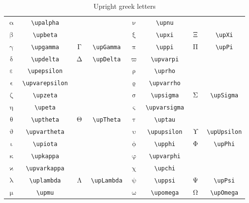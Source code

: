 \documentclass{article}
\begin{document}
\begin{table}
  \caption{Upright greek letters}
  \label{tab:upright-greek-letters}
  \centering
  \begin{tabular}[c]{cccc@{\hskip 3em}cccc}
    \toprule
    $\upalpha$ & \verb|\upalpha| & & &
    $\upnu$ & \verb|\upnu| & & \\
    $\upbeta$ & \verb|\upbeta| & & &
    $\upxi$ & \verb|\upxi| & $\upXi$ & \verb|\upXi| \\
    $\upgamma$ & \verb|\upgamma| & $\upGamma$ & \verb|\upGamma| &
    $\uppi$ & \verb|\uppi| & $\upPi$ & \verb|\upPi| \\
    $\updelta$ & \verb|\updelta| & $\upDelta$ & \verb|\upDelta| &
    $\upvarpi$ & \verb|\upvarpi| & & \\
    $\upepsilon$ & \verb|\upepsilon| & & &
    $\uprho$ & \verb|\uprho| & & \\
    \addlinespace
    $\upvarepsilon$ & \verb|\upvarepsilon| & & &
    $\upvarrho$ & \verb|\upvarrho| & & \\
    $\upzeta$ & \verb|\upzeta| & & &
    $\upsigma$ & \verb|\upsigma| & $\upSigma$ & \verb|\upSigma| \\
    $\upeta$ & \verb|\upeta| & & &
    $\upvarsigma$ & \verb|\upvarsigma| & & \\
    $\uptheta$ & \verb|\uptheta| & $\upTheta$ & \verb|\upTheta| &
    $\uptau$ & \verb|\uptau| & & \\
    $\upvartheta$ & \verb|\upvartheta| & & &
    $\upupsilon$ & \verb|\upupsilon| & $\upUpsilon$ & \verb|\upUpsilon| \\
    \addlinespace
    $\upiota$ & \verb|\upiota| & & &
    $\upphi$ & \verb|\upphi| & $\upPhi$ & \verb|\upPhi| \\
    $\upkappa$ & \verb|\upkappa| & & &
    $\upvarphi$ & \verb|\upvarphi| & & \\
    $\upvarkappa$ & \verb|\upvarkappa| & & &
    $\upchi$ & \verb|\upchi| & & \\
    $\uplambda$ & \verb|\uplambda| & $\upLambda$ & \verb|\upLambda| &
    $\uppsi$ & \verb|\uppsi| & $\upPsi$ & \verb|\upPsi| \\
    $\upmu$ & \verb|\upmu| & & &
    $\upomega$ & \verb|\upomega| & $\upOmega$ & \verb|\upOmega| \\
    \bottomrule
  \end{tabular}
\end{table}
\end{document}
